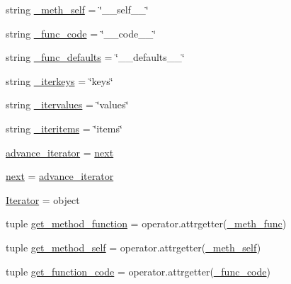 \begin{DoxyCompactItemize}
\item 
string \hyperlink{namespacescipy_1_1lib_1_1six_a66152749cc40e3c239bd0e0c4aeedb90}{\+\_\+meth\+\_\+self} = \char`\"{}\+\_\+\+\_\+self\+\_\+\+\_\+\char`\"{}
\item 
string \hyperlink{namespacescipy_1_1lib_1_1six_ac545e94c76d9e5fcddb5250c6b9d3488}{\+\_\+func\+\_\+code} = \char`\"{}\+\_\+\+\_\+code\+\_\+\+\_\+\char`\"{}
\item 
string \hyperlink{namespacescipy_1_1lib_1_1six_ac1f638625e833bbc1aa8b8ce89c0ec14}{\+\_\+func\+\_\+defaults} = \char`\"{}\+\_\+\+\_\+defaults\+\_\+\+\_\+\char`\"{}
\item 
string \hyperlink{namespacescipy_1_1lib_1_1six_a0256da3990b6251c0253332b6eeefbfa}{\+\_\+iterkeys} = \char`\"{}keys\char`\"{}
\item 
string \hyperlink{namespacescipy_1_1lib_1_1six_ab07b53dada42eaa999f6828579b08882}{\+\_\+itervalues} = \char`\"{}values\char`\"{}
\item 
string \hyperlink{namespacescipy_1_1lib_1_1six_a349f14c8041d39655525c667d2ce53c7}{\+\_\+iteritems} = \char`\"{}items\char`\"{}
\item 
\hyperlink{namespacescipy_1_1lib_1_1six_a07b34cda7d723e8939be816524b0b0ad}{advance\+\_\+iterator} = \hyperlink{namespacescipy_1_1lib_1_1six_ad6757495ee04551ef94f22f4e8b786cf}{next}
\item 
\hyperlink{namespacescipy_1_1lib_1_1six_ad6757495ee04551ef94f22f4e8b786cf}{next} = \hyperlink{namespacescipy_1_1lib_1_1six_a07b34cda7d723e8939be816524b0b0ad}{advance\+\_\+iterator}
\item 
\hyperlink{namespacescipy_1_1lib_1_1six_a8da3a9399ce223ec6de35326dc084c3c}{Iterator} = object
\item 
tuple \hyperlink{namespacescipy_1_1lib_1_1six_ac4c59f8317f4990af5036a78596f03d5}{get\+\_\+method\+\_\+function} = operator.\+attrgetter(\hyperlink{namespacescipy_1_1lib_1_1six_a1b44ea9070c7951d1da4e12927b3d7e5}{\+\_\+meth\+\_\+func})
\item 
tuple \hyperlink{namespacescipy_1_1lib_1_1six_af536c0c20ba9c3ec7d8e0614796fd622}{get\+\_\+method\+\_\+self} = operator.\+attrgetter(\hyperlink{namespacescipy_1_1lib_1_1six_a66152749cc40e3c239bd0e0c4aeedb90}{\+\_\+meth\+\_\+self})
\item 
tuple \hyperlink{namespacescipy_1_1lib_1_1six_ae03452fac31fa69197db452dad9b9c60}{get\+\_\+function\+\_\+code} = operator.\+attrgetter(\hyperlink{namespacescipy_1_1lib_1_1six_ac545e94c76d9e5fcddb5250c6b9d3488}{\+\_\+func\+\_\+code})
\item 

\end{DoxyCompactItemize}
